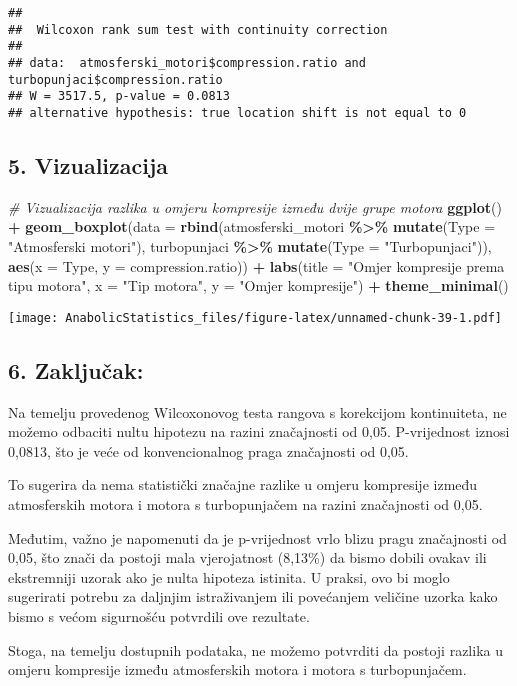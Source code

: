 \documentclass[
]{article}
\newenvironment{Shaded}{\begin{snugshade}}{\end{snugshade}}
\newcommand{\AttributeTok}[1]{\textcolor[rgb]{0.13,0.29,0.53}{#1}}
\newcommand{\CommentTok}[1]{\textcolor[rgb]{0.56,0.35,0.01}{\textit{#1}}}
\newcommand{\FunctionTok}[1]{\textcolor[rgb]{0.13,0.29,0.53}{\textbf{#1}}}
\newcommand{\NormalTok}[1]{#1}
\newcommand{\SpecialCharTok}[1]{\textcolor[rgb]{0.81,0.36,0.00}{\textbf{#1}}}
\newcommand{\StringTok}[1]{\textcolor[rgb]{0.31,0.60,0.02}{#1}}
\begin{document}
\begin{verbatim}
## 
##  Wilcoxon rank sum test with continuity correction
## 
## data:  atmosferski_motori$compression.ratio and turbopunjaci$compression.ratio
## W = 3517.5, p-value = 0.0813
## alternative hypothesis: true location shift is not equal to 0
\end{verbatim}

\subsection{5. Vizualizacija}\label{vizualizacija}

\begin{Shaded}
\begin{Highlighting}[]
\CommentTok{\# Vizualizacija razlika u omjeru kompresije između dvije grupe motora}
\FunctionTok{ggplot}\NormalTok{() }\SpecialCharTok{+}
  \FunctionTok{geom\_boxplot}\NormalTok{(}\AttributeTok{data =} \FunctionTok{rbind}\NormalTok{(atmosferski\_motori }\SpecialCharTok{\%\textgreater{}\%} \FunctionTok{mutate}\NormalTok{(}\AttributeTok{Type =} \StringTok{"Atmosferski motori"}\NormalTok{),}
\NormalTok{                            turbopunjaci }\SpecialCharTok{\%\textgreater{}\%} \FunctionTok{mutate}\NormalTok{(}\AttributeTok{Type =} \StringTok{"Turbopunjaci"}\NormalTok{)),}
               \FunctionTok{aes}\NormalTok{(}\AttributeTok{x =}\NormalTok{ Type, }\AttributeTok{y =}\NormalTok{ compression.ratio)) }\SpecialCharTok{+}
  \FunctionTok{labs}\NormalTok{(}\AttributeTok{title =} \StringTok{"Omjer kompresije prema tipu motora"}\NormalTok{,}
       \AttributeTok{x =} \StringTok{"Tip motora"}\NormalTok{,}
       \AttributeTok{y =} \StringTok{"Omjer kompresije"}\NormalTok{) }\SpecialCharTok{+}
  \FunctionTok{theme\_minimal}\NormalTok{()}
\end{Highlighting}
\end{Shaded}

\texttt{[image: AnabolicStatistics\_files/figure-latex/unnamed-chunk-39-1.pdf]}

\subsection{6. Zaključak:}\label{zakljuux10dak-1}

Na temelju provedenog Wilcoxonovog testa rangova s korekcijom
kontinuiteta, ne možemo odbaciti nultu hipotezu na razini značajnosti od
0,05. P-vrijednost iznosi 0,0813, što je veće od konvencionalnog praga
značajnosti od 0,05.

To sugerira da nema statistički značajne razlike u omjeru kompresije
između atmosferskih motora i motora s turbopunjačem na razini
značajnosti od 0,05.

Međutim, važno je napomenuti da je p-vrijednost vrlo blizu pragu
značajnosti od 0,05, što znači da postoji mala vjerojatnost (8,13\%) da
bismo dobili ovakav ili ekstremniji uzorak ako je nulta hipoteza
istinita. U praksi, ovo bi moglo sugerirati potrebu za daljnjim
istraživanjem ili povećanjem veličine uzorka kako bismo s većom
sigurnošću potvrdili ove rezultate.

Stoga, na temelju dostupnih podataka, ne možemo potvrditi da postoji
razlika u omjeru kompresije između atmosferskih motora i motora s
turbopunjačem.
\end{document}

